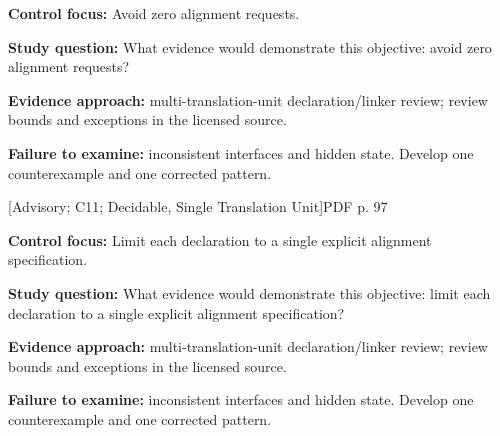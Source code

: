 \documentclass[10pt,letterpaper]{article}
\begin{document}
\textbf{Control focus:} Avoid zero alignment requests.\par
\textbf{Study question:} What evidence would demonstrate this objective: avoid zero alignment requests?\par
\textbf{Evidence approach:} multi-translation-unit declaration/linker review; review bounds and exceptions in the licensed source.\par
\textbf{Failure to examine:} inconsistent interfaces and hidden state. Develop one counterexample and one corrected pattern.\par
\smallskip
{}
 \textsf{\footnotesize [Advisory; C11; Decidable, Single Translation Unit]}\hfill{\footnotesize PDF p. 97}\par
\textbf{Control focus:} Limit each declaration to a single explicit alignment specification.\par
\textbf{Study question:} What evidence would demonstrate this objective: limit each declaration to a single explicit alignment specification?\par
\textbf{Evidence approach:} multi-translation-unit declaration/linker review; review bounds and exceptions in the licensed source.\par
\textbf{Failure to examine:} inconsistent interfaces and hidden state. Develop one counterexample and one corrected pattern.\par
\smallskip
\end{document}
